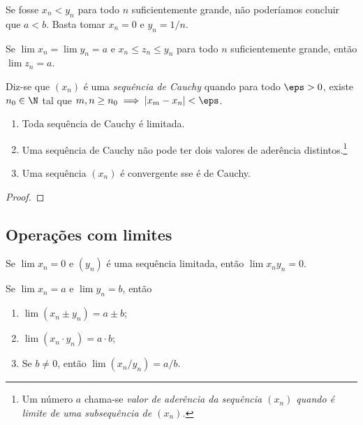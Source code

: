 \documentclass{article}
\begin{document}
\begin{rem}
    Se fosse \(x_n < y_n\) para todo \(n\) suficientemente grande, não poderíamos concluir que \(a < b\). Basta tomar \(x_n = 0\) e \(y_n = 1/n\).
\end{rem}

\begin{thm} 
    Se \(\lim x_n = \lim y_n = a\) e \(x_n \leq z_n \leq y_n\) para todo \(n\) suficientemente grande, então \(\lim z_n = a\).
\end{thm}

\begin{defn} 
    Diz-se que \((x_n)\) é uma \emph{sequência de Cauchy} quando para todo \(\eps > 0\), existe \(n_0 \in \N\) tal que \(m, n \geq n_0 \implies |x_m - x_n| < \eps\).
\end{defn}

\begin{prop}
    \begin{enumerate}
        \item [(a)] Toda sequência de Cauchy é limitada.
        \item [(b)] Uma sequência de Cauchy não pode ter dois valores de aderência distintos.\footnote{Um número \(a\) chama-se \emph{valor de aderência da sequência \((x_n)\) quando é limite de uma subsequência de \((x_n)\).}}
        \item [(c)] Uma sequência \((x_n)\) é convergente sse é de Cauchy.
    \end{enumerate}
\end{prop}

\begin{proof}
    
\end{proof}

\subsection{Operações com limites}

\begin{prop}
    Se \(\lim x_n = 0\) e \((y_n)\) é uma sequência limitada, então \(\lim x_n y_n = 0\).
\end{prop}

\begin{thm}
    Se \(\lim x_n = a\) e \(\lim y_n = b\), então
    \begin{enumerate}
        \item [(i)] \(\lim (x_n \pm y_n) = a \pm b\);
        \item [(ii)] \(\lim (x_n \cdot y_n) = a \cdot b\);
        \item [(iii)] Se \(b \neq 0\), então \(\lim (x_n / y_n) = a / b\).
    \end{enumerate}
\end{thm}
\end{document}
